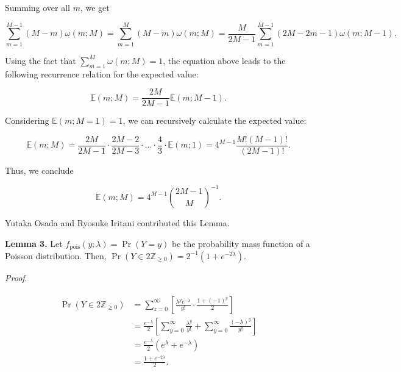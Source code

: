 \documentclass[11pt, class=article, crop=false]{standalone}
\begin{document}
Summing over all $m$, we get

\begin{equation}
    \sum_{m = 1}^{M - 1} (M - m) \omega(m; M)
    = \sum_{m = 1}^{M} (M - m) \omega(m; M)
    = \frac{M}{2M - 1} \sum_{m = 1}^{M - 1} (2M - 2m - 1) \omega(m; M - 1).
\end{equation}

Using the fact that $\sum_{m = 1}^{M} \omega(m; M) = 1$, the equation above leads to the following recurrence relation for the expected value:

\begin{equation}
    \mathbb{E}(m; M) = \frac{2M}{2M - 1} \mathbb{E}(m; M - 1).
\end{equation}

Considering $\mathbb{E}(m; M = 1) = 1$, we can recursively calculate the expected value:

\begin{equation}
    \mathbb{E}(m; M) = \frac{2M}{2M - 1} \cdot \frac{2M - 2}{2M - 3} \cdot \ldots \cdot \frac{4}{3} \cdot \mathbb{E}(m; 1) = 4^{M - 1} \frac{M!(M - 1)!}{(2M - 1)!}.
\end{equation}

Thus, we conclude

\begin{equation}
    \mathbb{E}(m; M) = 4^{M - 1} \binom{2M - 1}{M}^{-1}.
\end{equation}

Yutaka Osada and Ryosuke Iritani contributed this Lemma.

\textbf{Lemma 3.} Let $f_{\text{pois}}(y; \lambda) = \Pr(Y = y)$ be the probability mass function of a Poisson distribution.
Then, $\Pr(Y \in 2\mathbb{Z}_{\ge 0}) = 2^{-1}(1 + e^{- 2 \lambda})$.

\textit{Proof}.

\begin{align}
    \begin{split}
        \Pr(Y \in 2\mathbb{Z}_{\ge 0}) 
        &= \sum_{z = 0}^{\infty} \left[ \frac{\lambda^{y} e^{-\lambda}}{y!} \cdot \frac{1 + (-1)^{y}}{2} \right]\\
        &= \frac{e^{-\lambda}}{2} \left[ \sum_{y = 0}^{\infty} \frac{\lambda^{y}}{y!} + \sum_{y = 0}^{\infty} \frac{(-\lambda)^{y}}{y!}\right]\\
        &= \frac{e^{-\lambda}}{2} (e^{\lambda} + e^{-\lambda})\\
        &= \frac{1 + e^{- 2 \lambda}}{2}.
    \end{split}
\end{align}
\end{document}
